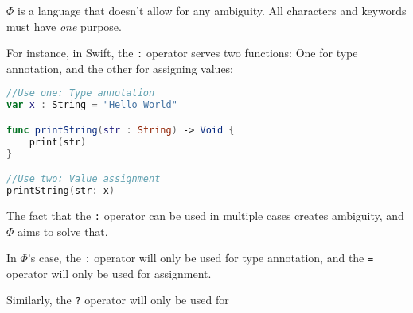 \documentclass[../../main.tex]{subfiles}
\begin{document}
$\Phi$ is a language that doesn't allow for any ambiguity. All characters and keywords must have \textit{one} purpose.

For instance, in Swift, the \texttt{:} operator serves two functions: One for type annotation, and the other for assigning values:

\begin{lstlisting}[language=swift]
//Use one: Type annotation
var x : String = "Hello World"

func printString(str : String) -> Void {
    print(str)
}

//Use two: Value assignment
printString(str: x)
\end{lstlisting}

The fact that the \texttt{:} operator can be used in multiple cases creates ambiguity, and $\Phi$ aims to solve that.

In $\Phi$'s case, the \texttt{:} operator will only be used for type annotation, and the \texttt{=} operator will only be used for assignment.

Similarly, the \texttt{?} operator will only be used for 
\end{document}
